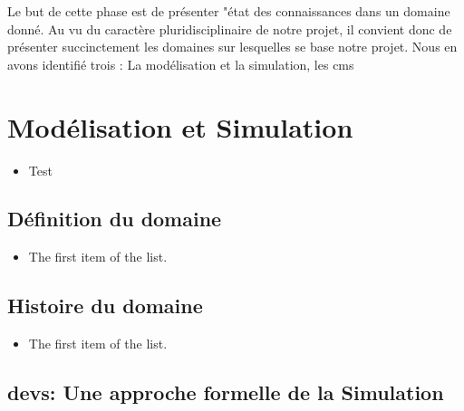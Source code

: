 \documentclass{rapport_stage}
\begin{document}
Le but de cette phase est de présenter "état des connaissances dans un domaine
donné. Au vu du caractère pluridisciplinaire de notre projet, il convient donc
de présenter succinctement les domaines sur lesquelles se base notre projet.
Nous en avons identifié trois : La modélisation et la simulation, les
\gls{cms}

\section{Modélisation et Simulation}

\begin{itemize}[label=$\bullet$]
  \item Test
\end{itemize}

\subsection*{Définition du domaine}

\begin{itemize}[label=$\bullet$]
  \item The first item of the list.
\end{itemize}

\newpage

\subsection*{Histoire du domaine}

\begin{itemize}[label=$\bullet$]
  \item The first item of the list.
\end{itemize}



\subsection*{\gls{devs}: Une approche formelle de la Simulation }
\end{document}
